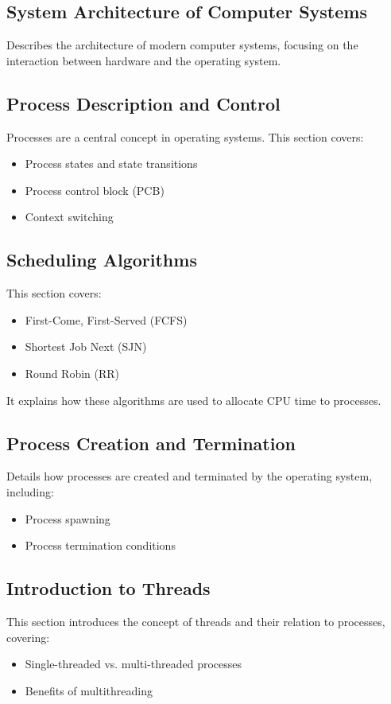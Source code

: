 \documentclass[12pt]{article}
\begin{document}
\begin{itemize}
\subsection{System Architecture of Computer Systems}
Describes the architecture of modern computer systems, focusing on the interaction between hardware and the operating system.

\subsection{Process Description and Control}
Processes are a central concept in operating systems. This section covers:
\begin{itemize}
    \item Process states and state transitions
    \item Process control block (PCB)
    \item Context switching
\end{itemize}

\subsection{Scheduling Algorithms}
This section covers:
\begin{itemize}
    \item First-Come, First-Served (FCFS)
    \item Shortest Job Next (SJN)
    \item Round Robin (RR)
\end{itemize}
It explains how these algorithms are used to allocate CPU time to processes.

\subsection{Process Creation and Termination}
Details how processes are created and terminated by the operating system, including:
\begin{itemize}
    \item Process spawning
    \item Process termination conditions
\end{itemize}

\subsection{Introduction to Threads}
This section introduces the concept of threads and their relation to processes, covering:
\begin{itemize}
    \item Single-threaded vs. multi-threaded processes
    \item Benefits of multithreading
\end{itemize}


\end{itemize}
\end{document}
